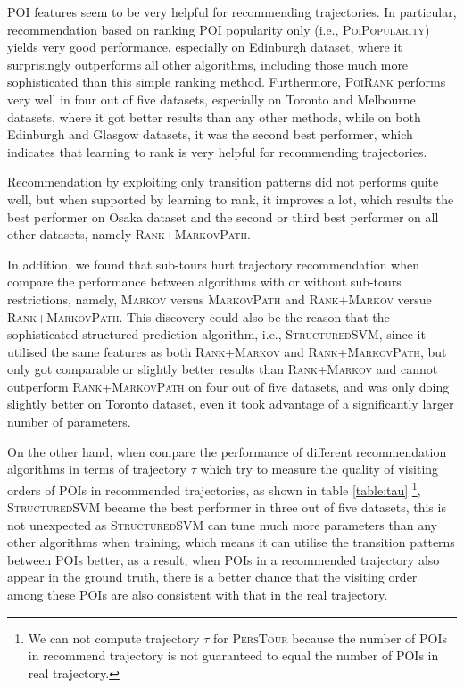POI features seem to be very helpful for recommending trajectories.
In particular, recommendation based on ranking POI popularity only
(i.e., \textsc{PoiPopularity}) yields very good performance,
especially on Edinburgh dataset, where it surprisingly outperforms all
other algorithms, including those much more sophisticated than this simple ranking method.
%
Furthermore, \textsc{PoiRank} performs very well in four out of five datasets,
especially on Toronto and Melbourne datasets, where it got better results than any other methods,
while on both Edinburgh and Glasgow datasets, it was the second best performer,
which indicates that learning to rank is very helpful for recommending trajectories.

Recommendation by exploiting only transition patterns did not performs quite well,
but when supported by learning to rank, it improves a lot, which results the best performer on Osaka dataset
and the second or third best performer on all other datasets, namely \textsc{Rank+MarkovPath}.

In addition, we found that sub-tours hurt trajectory recommendation when compare the performance between
algorithms with or without sub-tours restrictions, namely, \textsc{Markov} versus \textsc{MarkovPath} and
\textsc{Rank+Markov} versue \textsc{Rank+MarkovPath}.
%
This discovery could also be the reason that the sophisticated structured prediction algorithm,
i.e., \textsc{StructuredSVM}, since it utilised the same features as both \textsc{Rank+Markov} and
\textsc{Rank+MarkovPath}, but only got comparable or slightly better results than \textsc{Rank+Markov}
and cannot outperform \textsc{Rank+MarkovPath} on four out of five datasets, and was only doing slightly
better on Toronto dataset, even it took advantage of a significantly larger number of parameters.

On the other hand, when compare the performance of different recommendation algorithms in terms of trajectory $\tau$
which try to measure the quality of visiting orders of POIs in recommended trajectories,
as shown in table \ref{table:tau}
\footnote{We can not compute trajectory $\tau$ for \textsc{PersTour} because the number of POIs in recommend trajectory
is not guaranteed to equal the number of POIs in real trajectory.},
\textsc{StructuredSVM} became the best performer in three out of five datasets,
this is not unexpected as \textsc{StructuredSVM} can tune much more parameters than any other algorithms when training,
which means it can utilise the transition patterns between POIs better,
as a result, when POIs in a recommended trajectory also appear in the ground truth,
there is a better chance that the visiting order among these POIs are also consistent with
that in the real trajectory.

